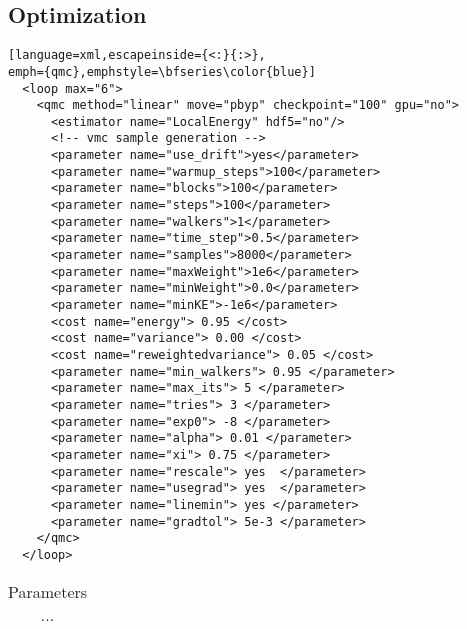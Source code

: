 \subsection{Optimization}

\begin{lstlisting}[language=xml,escapeinside={<:}{:>},
emph={qmc},emphstyle=\bfseries\color{blue}]
  <loop max="6">
    <qmc method="linear" move="pbyp" checkpoint="100" gpu="no">
      <estimator name="LocalEnergy" hdf5="no"/>
      <!-- vmc sample generation -->
      <parameter name="use_drift">yes</parameter>
      <parameter name="warmup_steps">100</parameter>
      <parameter name="blocks">100</parameter>
      <parameter name="steps">100</parameter>
      <parameter name="walkers">1</parameter>
      <parameter name="time_step">0.5</parameter>
      <parameter name="samples">8000</parameter>
      <parameter name="maxWeight">1e6</parameter>
      <parameter name="minWeight">0.0</parameter>
      <parameter name="minKE">-1e6</parameter>
      <cost name="energy"> 0.95 </cost>
      <cost name="variance"> 0.00 </cost>
      <cost name="reweightedvariance"> 0.05 </cost>
      <parameter name="min_walkers"> 0.95 </parameter>
      <parameter name="max_its"> 5 </parameter>
      <parameter name="tries"> 3 </parameter>
      <parameter name="exp0"> -8 </parameter>
      <parameter name="alpha"> 0.01 </parameter>
      <parameter name="xi"> 0.75 </parameter>
      <parameter name="rescale"> yes  </parameter>
      <parameter name="usegrad"> yes  </parameter>
      <parameter name="linemin"> yes </parameter>
      <parameter name="gradtol"> 5e-3 </parameter> 
    </qmc>
  </loop>
\end{lstlisting}
\begin{table}[h]
\begin{center}
\begin{tabular}{llll}\hline
\end{tabular}
\end{center}
\caption{Parameters ...}
\label{req.packages}
\end{table}

